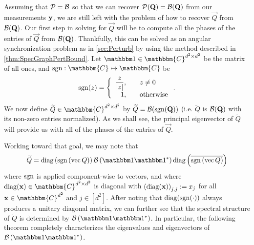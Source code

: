 Assuming that $\mathcal{P} = \mathcal{B}$ so that we can recover $\mathcal{P} ( \mathbf{Q} ) = \mathcal{B} ( \mathbf{Q} )$ from our measurements $\mathbf{y}$, we are still left with the problem of how to recover $\vec{Q}$ from $\mathcal{B} ( \mathbf{Q} )$.  Our first step in solving for $\vec{Q}$ will be to compute all the phases of the entries of $\vec{Q}$ from $\mathcal{B}(\mathbf{Q})$.  Thankfully, this can be solved as an angular synchronization problem as in \cref{sec:Perturb} by using the method described in \cref{thm:SpecGraphPertBound}.  Let $\one \in \mathbbm{C}^{d^2 \times d^2}$ be the matrix of all ones, and $\sgn: \mathbbm{C} \mapsto  \mathbbm{C}$ be 
$$\sgn(z) = \left\{\begin{array}{r@{,\qquad}l} \dfrac{z}{|z|} & z \neq 0 \\ 1 & \text{otherwise} \end{array}\right..$$
We now define $\widetilde{Q} \in \mathbbm{C}^{d^2 \times d^2}$ by $\widetilde{Q} = \mathcal{B}(\operatorname{sgn}(\mathbf{Q}))$ (i.e. $\widetilde{Q}$ is $\mathcal{B}(\mathbf{Q})$ with its non-zero entries normalized). %
As we shall see, the principal eigenvector of $\widetilde{Q}$ will provide us with all of the phases of the entries of $\vec{Q}$.

Working toward that goal, we may note that
\begin{equation}
\widetilde{Q} = \diag \left( \sgn \left( \vec{Q} \right) \right) \B \left( \one \one^* \right) \diag \left( \overline{\sgn \left( \vec{Q} \right)} \right)
\label{equ:Qtilde_partial_factor}
\end{equation}
where $\operatorname{sgn}$ is applied component-wise to vectors, and where $\diag(\x)  \in \mathbbm{C}^{d^2 \times d^2}$ is diagonal with $\left(\operatorname{diag}(\mathbf{x})\right)_{j,j} := x_j$ for all $\x \in \mathbbm{C}^{d^2}$ and $j \in [d^2]$.  After noting that $\operatorname{diag}(\operatorname{sgn}(\cdot))$ always produces a unitary diagonal matrix, we can further see that the spectral structure of $\widetilde{Q}$ is determined by $\B \left( \one \one^* \right)$.  In particular, the following theorem completely characterizes the eigenvalues and eigenvectors of $\B \left( \one \one^* \right)$.

